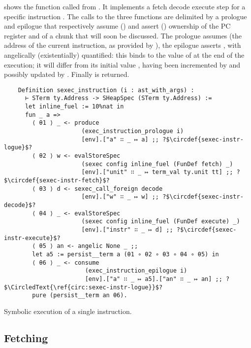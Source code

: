  shows the  function called from . It implements a fetch  decode  execute  step for a specific instruction . The calls to the three functions are delimited by a prologue and epilogue  that respectively assume () and assert () ownership of the PC register and of a  chunk that will soon be discussed. The prologue assumes  (the address of the current instruction, as provided by ), the epilogue asserts , with  angelically (existentially) quantified: this binds  to the value of  at the end of the execution; it will differ from its initial value , having been incremented by  and possibly updated by . Finally  is returned.

\begin{listing}[h]
  \startcstep
  \begin{verbatim}
    Definition sexec_instruction (i : ast_with_args) :
      ⊢ STerm ty.Address -> SHeapSpec (STerm ty.Address) :=
      let inline_fuel := 10%nat in
      fun _ a =>
        ⟨ θ1 ⟩ _ <- produce
                      (exec_instruction_prologue i)
                      [env].["a" ∷ _ ↦ a] ;; ?$\circdef{sexec-instr-logue}$?
        ⟨ θ2 ⟩ w <- evalStoreSpec
                      (sexec config inline_fuel (FunDef fetch) _)
                      [env].["unit" ∷ _ ↦ term_val ty.unit tt] ;; ?$\circdef{sexec-instr-fetch}$?
        ⟨ θ3 ⟩ d <- sexec_call_foreign decode
                      [env].["w" ∷ _ ↦ w] ;; ?$\circdef{sexec-instr-decode}$?
        ⟨ θ4 ⟩ _ <- evalStoreSpec
                      (sexec config inline_fuel (FunDef execute) _)
                      [env].["instr" ∷ _ ↦ d] ;; ?$\circdef{sexec-instr-execute}$?
        ⟨ θ5 ⟩ an <- angelic None _ ;;
        let a5 := persist__term a (θ1 ∘ θ2 ∘ θ3 ∘ θ4 ∘ θ5) in
        ⟨ θ6 ⟩ _ <- consume
                       (exec_instruction_epilogue i)
                       [env].["a" ∷ _ ↦ a5].["an" ∷ _ ↦ an] ;; ?$\CircledText{\ref{circ:sexec-instr-logue}}$?
        pure (persist__term an θ6).
  \end{verbatim}
  \caption{Symbolic execution of a single instruction.}
  \label{lst:sexec-instr}
\end{listing}

\subsection{Fetching}

